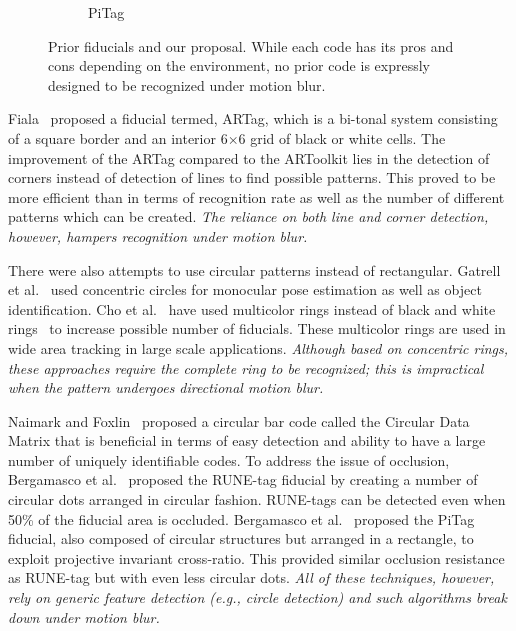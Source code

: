 \begin{figure}[b!]
\begin{subfigure}[b]{0.2\linewidth}
  PiTag\quad~\cite{Pitag13}
 \end{subfigure}
 \caption[Prior fiducials]{Prior fiducials and our proposal. 
 While each code has its pros and cons depending on the environment, no
 prior code is expressly designed to be recognized under motion blur.}
 \label{fig:previous_work}
\end{figure}


Fiala~\cite{Fiala05} proposed a fiducial termed, ARTag, which is a
bi-tonal system consisting of a square border and an interior
6$\times$6 grid of black or white cells. The improvement of the ARTag
compared to the ARToolkit lies in the detection of corners instead of
detection of lines to find possible patterns.  This proved to be more
efficient than \cite{ARToolkit02} in terms of recognition rate as well
as the number of different patterns which can be created.  {\it The
reliance on both line and corner detection, however, hampers
recognition under motion blur.}

There were also attempts to use circular patterns instead of
rectangular.  Gatrell et al.~\cite{concentric} used concentric circles
for monocular pose estimation as well as object identification. Cho et
al.~\cite{Cho:2001,Cho97fastcolor} have used multicolor rings instead
of black and white rings~\cite{concentric} to increase possible number
of fiducials.  These multicolor rings are used in wide area tracking
in large scale applications.  {\it Although based on  concentric rings, these
approaches require the complete ring to be recognized; this is
impractical when the pattern undergoes directional motion blur.}

Naimark and Foxlin~\cite{NaimarkF02} proposed a circular bar code
called the Circular Data Matrix that is beneficial in terms of easy
detection and ability to have a large number of uniquely identifiable
codes.  To address the issue of occlusion, Bergamasco et
al.~\cite{runetag11} proposed the RUNE-tag fiducial by creating a
number of circular dots arranged in circular fashion. RUNE-tags can be
detected even when 50\% of the fiducial area is occluded. Bergamasco
et al.~\cite{Pitag13} proposed the PiTag fiducial, also composed of
circular structures but arranged in a rectangle, to exploit projective
invariant cross-ratio.  This provided similar occlusion resistance as
RUNE-tag but with even less circular dots. {\it All of these techniques,
however, rely on generic feature detection (e.g., circle detection)
and such algorithms break down under motion blur.}\\

